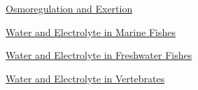 \documentclass[12pt,letterpaper]{article}
\begin{document}
\hypertarget{40.1}{}
\begin{secbox}{\hyperlink{40}{Osmoregulation and Exertion}}{

}\end{secbox}
\hypertarget{40.2}{}
\begin{secbox}{\hyperlink{40}{Water and Electrolyte in Marine Fishes}}{

}\end{secbox}
\hypertarget{40.3}{}
\begin{secbox}{\hyperlink{40}{Water and Electrolyte in Freshwater Fishes}}{

}\end{secbox}
\hypertarget{40.5}{}
\begin{secbox}{\hyperlink{40}{Water and Electrolyte in Vertebrates}}{

}\end{secbox}
\end{document}
